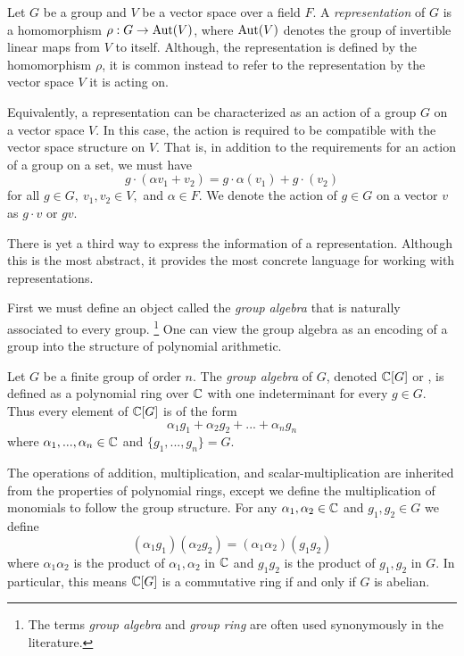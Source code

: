 \begin{definition}
    Let $G$ be a group and $V$ be a vector space over a field $F$. A \emph{representation} of $G$ is a homomorphism 
    $\rho : G \rightarrow \operatorname{Aut}(V)$, where $\operatorname{Aut}(V)$ denotes the group of invertible linear maps from $V$ to itself.  
    Although, the representation is defined by the homomorphism $\rho$, it is common instead to refer to the 
    representation by the vector space $V$ it is acting on.
    
    Equivalently, a representation can be characterized as an action of a group $G$ on a vector space $V$. In this 
    case, the action is required to be compatible with the vector space structure on $V$. That is, in addition to 
    the requirements for an action of a group on a set, we must have
\[g \cdot (\alpha v_1 + v_2) = g\cdot \alpha(v_1) + g\cdot(v_2)\]
    for all $g \in G,\ v_1, v_2 \in V,$ and $\alpha \in F$.
    We denote the action of $g \in G$ on a vector $v$ as $g \cdot v$ or $gv$.
\end{definition}


    There is yet a third way to express the information of a representation. Although this is the most abstract, it 
    provides the most concrete language for working with representations.
    
    First we must define an object called the \emph{group algebra} that is naturally associated to every group.
    \footnote{The terms \emph{group algebra} and \emph{group ring} are often used synonymously in the literature.} 
    One can view the group algebra as an encoding of a group into the structure of polynomial arithmetic.


\begin{definition}
    Let $G$ be a finite group of order $n$. The \emph{group algebra} of $G$, denoted $\mathbb{C}[G]$ or \CG, is defined as 
    a polynomial ring over $\mathbb{C}$ with one indeterminant for every $g \in G$. Thus every element of $\mathbb{C}[G]$ is of the 
    form
    \[
        \alpha_1 g_1 + \alpha_2 g_2 + ... + \alpha_n g_n
    \]
    where $\alpha_1, ..., \alpha_n \in \mathbb{C}$ and $\{g_1, ..., g_n\} = G$.
    
    The operations of addition, multiplication, and scalar-multiplication are inherited from the properties of 
    polynomial rings, except we define the multiplication of monomials to follow the group structure.
    For any $\alpha_1, \alpha_2 \in \mathbb{C}$ and $g_1, g_2 \in G$ we define
    \[
        (\alpha_1g_1)(\alpha_2g_2) = (\alpha_1\alpha_2)(g_1g_2)
    \]
    where $\alpha_1\alpha_2$ is the product of $\alpha_1, \alpha_2$ in $\mathbb{C}$ and $g_1 g_2$ is the product of $g_1, 
    g_2$ in $G$. In particular, this means $\mathbb{C}[G]$ is a commutative ring if and only if $G$ is abelian.
\end{definition}

